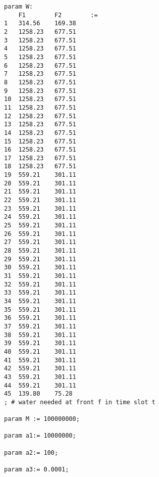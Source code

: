 \begin{lstlisting}
param W:
	F1        F2        :=
1	314.56    169.38
2	1258.23   677.51
3	1258.23   677.51
4	1258.23   677.51
5	1258.23   677.51
6	1258.23   677.51
7	1258.23   677.51
8	1258.23   677.51
9	1258.23   677.51
10	1258.23   677.51
11	1258.23   677.51
12	1258.23   677.51
13	1258.23   677.51
14	1258.23   677.51
15	1258.23   677.51
16	1258.23   677.51
17	1258.23   677.51
18	1258.23   677.51
19	559.21    301.11
20	559.21    301.11
21	559.21    301.11
22	559.21    301.11
23	559.21    301.11
24	559.21    301.11
25	559.21    301.11
26	559.21    301.11
27	559.21    301.11
28	559.21    301.11
29	559.21    301.11
30	559.21    301.11
31	559.21    301.11
32	559.21    301.11
33	559.21    301.11
34	559.21    301.11
35	559.21    301.11
36	559.21    301.11
37	559.21    301.11
38	559.21    301.11
39	559.21    301.11
40	559.21    301.11
41	559.21    301.11
42	559.21    301.11
43	559.21    301.11
44	559.21    301.11
45	139.80    75.28
; # water needed at front f in time slot t

param M := 100000000;

param a1:= 10000000;

param a2:= 100;

param a3:= 0.0001;
\end{lstlisting}
